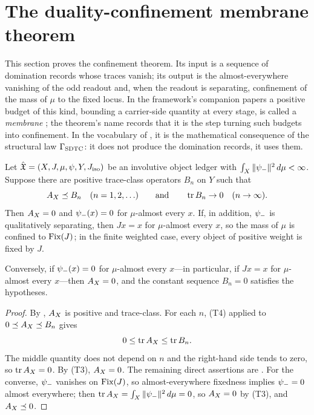 \section{The duality-confinement membrane theorem}
\label{sec:master_theorem}

This section proves the confinement theorem.  Its input is a sequence
of domination records whose traces vanish; its output is the
almost-everywhere vanishing of the odd readout and, when the readout is
separating, confinement of the mass of \(\mu\) to the fixed locus.  In the
framework's companion papers a positive budget of this kind, bounding
a carrier-side quantity at every stage, is called a \emph{membrane}
\citep{TsiokosNeedleKiller2026}; the theorem's name records that it is
the step turning such budgets into confinement.  In the vocabulary of
, it is the mathematical consequence of the
structural law \(\Gamma_{\mathrm{SDTC}}\): it does not produce the domination
records, it uses them.

\begin{theorem}
\label{thm:duality_confinement:master-theorem}
Let \(\hat{\mathfrak{X}}=(X,J,\mu,\psi,Y,J_{\mathrm{iso}})\) be an involutive object ledger with
\(\int_X\|\psi_{-}\|^2\,d\mu<\infty\).  Suppose there are positive
trace-class operators \(B_n\) on \(Y\) such that
\[
  A_{X}\preceq B_n\quad(n=1,2,\ldots)
  \qquad\text{and}\qquad
  \operatorname{tr} B_n\to0\quad(n\to\infty).
\]
Then \(A_{X}=0\) and \(\psi_{-}(x)=0\) for \(\mu\)-almost every \(x\).  If,
in addition, \(\psi_{-}\) is qualitatively separating, then \(Jx=x\) for
\(\mu\)-almost every \(x\), so the mass of \(\mu\) is confined to
\(\operatorname{Fix}(J)\); in the finite weighted case, every object of positive
weight is fixed by \(J\).

Conversely, if \(\psi_{-}(x)=0\) for \(\mu\)-almost every \(x\)---in
particular, if \(Jx=x\) for \(\mu\)-almost every \(x\)---then
\(A_{X}=0\), and the constant sequence \(B_n=0\) satisfies the
hypotheses.
\end{theorem}

\begin{proof}
By , \(A_{X}\) is positive
and trace-class.  For each \(n\), (T4) applied to
\(0\preceq A_{X}\preceq B_n\) gives
\[
  0\leq\operatorname{tr}A_{X}\leq\operatorname{tr} B_n .
\]
The middle quantity does not depend on \(n\) and the right-hand side
tends to zero, so \(\operatorname{tr}A_{X}=0\).  By (T3), \(A_{X}=0\).  The remaining
direct assertions are
.  For the
converse, \(\psi_{-}\) vanishes on \(\operatorname{Fix}(J)\), so almost-everywhere
fixedness implies \(\psi_{-}=0\) almost everywhere; then
\(\operatorname{tr}A_{X}=\int_X\|\psi_{-}\|^2\,d\mu=0\), so \(A_{X}=0\) by (T3), and
\(A_{X}\preceq0\).
\end{proof}

